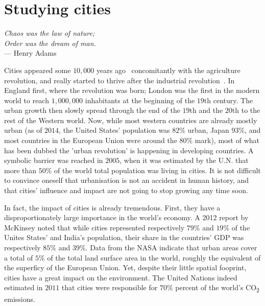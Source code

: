 \chapter{Studying cities}
\label{chap:studying_cities}

\begin{flushright}{\slshape    
Chaos was the law of nature;\\
Order was the dream of man.} \\ \medskip
--- Henry Adams~\cite{Adams:1990}
\end{flushright}

\bigskip

Cities appeared some $10,000$ years ago~\cite{Bairoch:1985, Mumford:1961}
concomitantly with the agriculture revolution, and really started to
thrive after the industrial revolution~\cite{Bairoch:1985}.  In England first,
where the revolution was born; London was the first in the modern world
to reach $1,000,000$ inhabitants at the beginning of the $19$th century. The
urban growth then slowly spread through the end of the $19$th and the $20$th to
the rest of the Western world. Now, while most western countries are already
mostly urban (as of $2014$, the United States' population was $82\%$ urban,
Japan $93\%$, and most countries in the European Union were around the $80\%$
mark), most of what has been dubbed the 'urban  revolution' is happening in developing countries. A symbolic
barrier was reached in $2005$, when it was estimated by the U.N. that more than
$50\%$ of the world total population was living in cities. It is not difficult
to convince oneself that urbanisation is not an accident in human history, and
that cities' influence and impact are not going to stop growing any time soon.

In fact, the impact of cities is already tremendous. First, they have a
disproportionately large importance in the world's economy. A 2012 report by
McKinsey noted that while cities represented respectively $79\%$ and $19\%$ of the Unites
States' and India's population, their share in the countries' GDP was
respectively $85\%$ and $39\%$. 
Data from the NASA indicate that urban areas cover a total of $5\%$ of the total
land surface area in the world, roughly the equivalent of the superficy of the
European Union. Yet, despite their little spatial fooprint, cities have a great
impact on the environment. The United Nations indeed estimated in $2011$ that cities were
responsible for $70\%$ percent of the world's CO\textsubscript{2} emissions.

